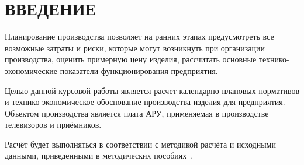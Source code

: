 \section*{ВВЕДЕНИЕ}

Планирование производства позволяет на ранних этапах предусмотреть все возможные затраты и
риски, которые могут возникнуть при организации производства,
оценить примерную цену изделия,
рассчитать основные технико-экономические показатели функционирования предприятия.

Целью данной курсовой работы является расчет календарно-плановых нормативов
и технико-экономическое обоснование производства изделия для предприятия.
Объектом производства является плата АРУ, применяемая в производстве
телевизоров и приёмников.

Расчёт будет выполняться в соответствии с методикой расчёта и
исходными данными, приведенными в методических пособиях~\cite{opiup_1,opiup_2}.